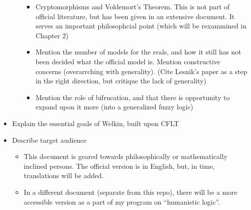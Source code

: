 \begin{itemize}
\begin{itemize}
                \begin{itemize}
                  \item Cryptomorphisms and Voldemort's Theorem. This is not part of official literature, but has been given in an extensive document. It serves an important philosophcial point (which will be rexammined in Chapter 2)
                  \item Mention the number of models for the reals, and how it still has not been decided what the official model is. Mention constructive concerns (overarrching with generality). (Cite Lesnik's paper as a step in the right direction, but critique the lack of generality)
                  \item Mention the role of bifrucation, and that there is opportunity to expand upon it more (into a generalized fuzzy logic)
                \end{itemize}
  \end{itemize}
  \item Explain the essential goals of Welkin, built upon CFLT
  \item Describe target audience
  \begin{itemize}
    \item This document is geared towards philosophically or mathematically inclined persons. The official version is in English, but, in time, translations will be added.
    \item In a different document (separate from this repo), there will be a more accessible version as a part of my program on ``humanistic logic''.
  \end{itemize}
\end{itemize}
